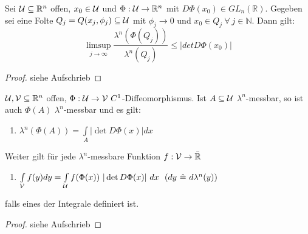   \begin{lemma}
    Sei $\mathcal{U} \subseteq \mathbb{R}^n$ offen, $x_0 \in \mathcal{U}$ und $\Phi: \mathcal{U} \to \mathbb{R}^n$ mit $D\Phi(x_0) \in GL_n(\mathbb{R})$. Gegeben sei eine Folte $Q_j = Q(x_j, \phi_j)\subseteq \mathcal{U}$ mit $\phi_j \to 0$ und $x_0 \in Q_j \ \forall \ j \in \mathbb{N}$. Dann gilt:
    $$\limsup\limits_{j \to \infty} \frac{\lambda^n(\Phi(Q_j))}{\lambda^n(Q_j)} \leq |det D\Phi(x_0)|$$
  \end{lemma}
  \begin{proof}
    siehe Aufschrieb
  \end{proof}

  \begin{theorem}[Transformationsformel]
    $\mathcal{U}, \mathcal{V} \subseteq\mathbb{R}^n$ offen, $\Phi:\script{U} \to \script{V} \ C^1$-Diffeomorphismus. Ist $A \subseteq \mathcal{U}$ $\lambda^n$-messbar, so ist auch $\Phi(A)$ $\lambda^n$-messbar und es gilt:
    \begin{enumerate}
      \item $\lambda^n(\Phi(A)) = \int\limits_A | \det D\Phi(x) | dx$
    \end{enumerate}
    Weiter gilt für jede $\lambda^n$-messbare Funktion $f: \mathcal{V} \to \bar{\mathbb{R}}$
    \begin{enumerate}[resume]
      \item $\int\limits_{\script{V}} f(y) dy = \int\limits_{\script{U}} f(\Phi(x)) \ |\det D\Phi(x)| \ dx \ \ (dy \ \hat{=} \ d\lambda^n(y))$
    \end{enumerate}
    falls eines der Integrale definiert ist.
  \end{theorem}

  \begin{proof}
    siehe Aufschrieb
  \end{proof}

